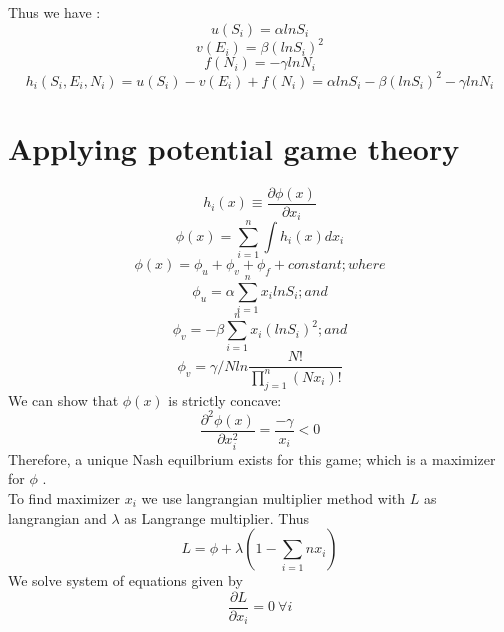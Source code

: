 \documentclass[letterpaper,english,10pt]{article}
\begin{document}
Thus we have :
\begin{equation}
    u(S_i) = \alpha ln S_i
\end{equation}
\begin{equation}
    v(E_i) = \beta (ln S_i)^2
\end{equation}
\begin{equation}
f(N_i) = - \gamma ln N_i
\end{equation}
\begin{equation}\label{utility}
 h_i(S_i,E_i,N_i) = u(S_i) - v(E_i) + f(N_i)= \alpha ln S_i - \beta (ln S_i)^2 - \gamma ln N_i
 \end{equation}
\section{Applying potential game theory}
\begin{equation}
    h_i(x) \equiv  \frac{\partial\phi(x)}{\partial x_i}
\end{equation}
\begin{equation} \label{potential}
    \phi(x) = \sum_{i=1}^{n}\int{}{}h_i(x)dx_i
\end{equation}
\begin{equation}
    \phi(x) = \phi_u + \phi_v + \phi_f + constant ; where
\end{equation}
\begin{equation}
    \phi_u = \alpha \sum_{i=1}^{n}x_i lnS_i ;and
\end{equation}
\begin{equation}
    \phi_v = -\beta \sum_{i=1}^{n} x_i(ln S_i)^2 ; and
\end{equation}
\begin{equation}
    \phi_v = \gamma/N ln \frac{N!}{\prod_{j=1}^{n}(Nx_i)!}
\end{equation}
We can show that $\phi(x)$ is strictly concave: 
\begin{equation}
    \dfrac{\partial^2 \phi(x)}{\partial x_i^2}= \dfrac{-\gamma}{x_i}<0
\end{equation}
Therefore, a unique Nash equilbrium exists for this game; which is a maximizer for $\phi$ . \\
To find maximizer $x_i$
we use langrangian multiplier method with $L$ as langrangian and $\lambda$ as Langrange multiplier. Thus 
\begin{equation}
     L=\phi + \lambda(1-\sum_{i=1}{n}x_i)
\end{equation}
We solve system of equations given by
\begin{equation}
     \frac{\partial L}{\partial x_i} =0 ~ \forall i
 \end{equation}
 
\end{document}
